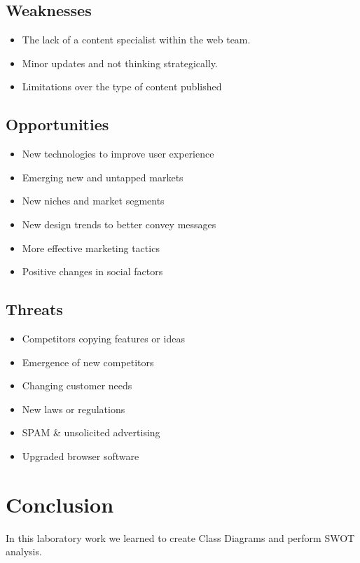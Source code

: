 \documentclass[12pt,a4paper,titlepage]{article}
\begin{document}
\subsection{Weaknesses}
\begin{itemize}
	\item The lack of a content specialist within the web team.
	\item Minor updates and not thinking strategically.
	\item Limitations over the type of content published
\end{itemize}
\subsection{Opportunities}
\begin{itemize}
	\item New technologies to improve user experience
	\item Emerging new and untapped markets
	\item New niches and market segments
	\item New design trends to better convey messages
	\item More effective marketing tactics
	\item Positive changes in social factors
\end{itemize}
\subsection{Threats}
\begin{itemize}
	\item Competitors copying features or ideas
	\item Emergence of new competitors
	\item Changing customer needs
	\item New laws or regulations
	\item SPAM \& unsolicited advertising
	\item Upgraded browser software
\end{itemize}

\section{Conclusion}
In this laboratory work we learned to create Class Diagrams and perform SWOT analysis.

\clearpage
\cleardoublepage
\end{document}
